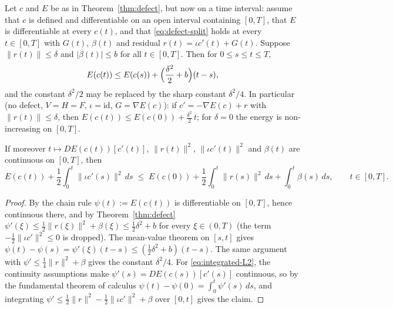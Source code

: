 \begin{Corollary}\label{cor:integrated}
Let $c$ and $E$ be as in Theorem~\ref{thm:defect}, but now on a time interval: assume that $c$ is defined and differentiable on an open interval containing $[0,T]$, that $E$ is differentiable at every $c(t)$, and that \eqref{eq:defect-split} holds at every $t\in[0,T]$ with $G(t)$, $\beta(t)$ and residual $r(t)=\iota c'(t)+G(t)$.
Suppose $\|r(t)\|\le\delta$ and $|\beta(t)|\le b$ for all $t\in[0,T]$. Then for $0\le s\le t\le T$,
\begin{equation}\label{eq:integrated}
E(c(t))\le E(c(s))+\Bigl(\frac{\delta^2}{2}+b\Bigr)(t-s),
\end{equation}
and the constant $\delta^2/2$ may be replaced by the sharp constant $\delta^2/4$.
In particular (no defect, $V=H=F$, $\iota=\mathrm{id}$, $G=\nabla E(c)$): if $c'=-\nabla E(c)+r$ with $\|r(t)\|\le\delta$, then $E(c(t))\le E(c(0))+\frac{\delta^2}{2}\,t$; for $\delta=0$ the energy is non-increasing on $[0,T]$.

If moreover $t\mapsto DE(c(t))[c'(t)]$, $\|r(t)\|^2$, $\|\iota c'(t)\|^2$ and $\beta(t)$ are continuous on $[0,T]$, then
\begin{equation}\label{eq:integrated-L2}
E(c(t))+\frac12\int_0^t\|\iota c'(s)\|^2\,ds\;\le\;E(c(0))+\frac12\int_0^t\|r(s)\|^2\,ds+\int_0^t\beta(s)\,ds,\qquad t\in[0,T].
\end{equation}
\end{Corollary}
\begin{proof}
By the chain rule $\psi(t):=E(c(t))$ is differentiable on $[0,T]$, hence continuous there, and by Theorem~\ref{thm:defect} $\psi'(\xi)\le\tfrac12\|r(\xi)\|^2+\beta(\xi)\le\tfrac12\delta^2+b$ for every $\xi\in(0,T)$ (the term $-\tfrac12\|\iota c'\|^2\le0$ is dropped).
The mean-value theorem on $[s,t]$ gives $\psi(t)-\psi(s)=\psi'(\xi)(t-s)\le(\tfrac12\delta^2+b)(t-s)$.
The same argument with $\psi'\le\tfrac14\|r\|^2+\beta$ gives the constant $\delta^2/4$.
For \eqref{eq:integrated-L2}, the continuity assumptions make $\psi'(s)=DE(c(s))[c'(s)]$ continuous, so by the fundamental theorem of calculus $\psi(t)-\psi(0)=\int_0^t\psi'(s)\,ds$, and integrating $\psi'\le\frac12\|r\|^2-\frac12\|\iota c'\|^2+\beta$ over $[0,t]$ gives the claim.
\end{proof}

